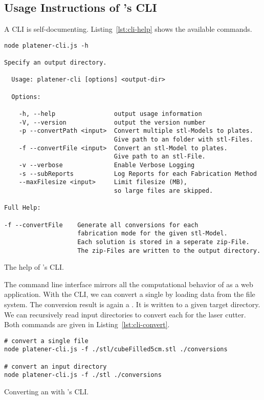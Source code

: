 \documentclass[../ClassicThesis.tex]{subfiles}
\begin{document}
\subsection{Usage Instructions of {\platener}'s CLI}
\label{sec:walkthrough-cli-usage}

A CLI is self-documenting. Listing~\ref{lst:cli-help} shows the
available commands.

\begin{listing}[!h]
\begin{verbatim}
node platener-cli.js -h

Specify an output directory.

  Usage: platener-cli [options] <output-dir>

  Options:

    -h, --help                output usage information
    -V, --version             output the version number
    -p --convertPath <input>  Convert multiple stl-Models to plates.
                              Give path to an folder with stl-Files.
    -f --convertFile <input>  Convert an stl-Model to plates.
                              Give path to an stl-File.
    -v --verbose              Enable Verbose Logging
    -s --subReports           Log Reports for each Fabrication Method
    --maxFilesize <input>     Limit filesize (MB),
                              so large files are skipped.

Full Help:

-f --convertFile    Generate all conversions for each
                    fabrication mode for the given stl-Model.
                    Each solution is stored in a seperate zip-File.
                    The zip-Files are written to the output directory.
\end{verbatim}
\caption{The help of {\platener}'s CLI.}
\label{lst:cli-help}
\end{listing}


The command line interface mirrors all the computational behavior of
{\platener} as a web application. With the CLI, we can convert a
single {\threedmodel} by loading data from the file system. The
conversion result is again a {\zipfile}. It is written to a given
target directory. We can recursively read input directories to
convert each {\stlfile} for the laser cutter. Both commands are given
in Listing~\ref{lst:cli-convert}.


\begin{listing}[!h]
\begin{verbatim}
# convert a single file
node platener-cli.js -f ./stl/cubeFilled5cm.stl ./conversions

# convert an input directory
node platener-cli.js -f ./stl ./conversions
\end{verbatim}
\caption{Converting an {\stlfile} with {\platener}'s CLI.}
\label{lst:cli-convert}
\end{listing}
\end{document}

